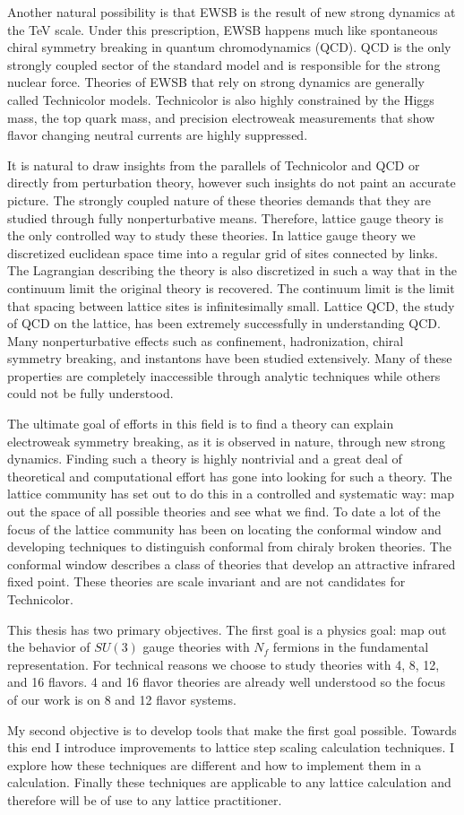 Another natural possibility is that EWSB is the result of new strong dynamics at the TeV scale.
Under this prescription, EWSB happens much like spontaneous chiral symmetry breaking in quantum chromodynamics (QCD).
QCD is the only strongly coupled sector of the standard model and is responsible for the strong nuclear force.
Theories of EWSB that rely on strong dynamics are generally called Technicolor models.
Technicolor is also highly constrained by the Higgs mass, the top quark mass, and precision electroweak measurements that show flavor changing neutral currents are highly suppressed.

It is natural to draw insights from the parallels of Technicolor and QCD or directly from perturbation theory, however such insights do not paint an accurate picture.
The strongly coupled nature of these theories demands that they are studied through fully nonperturbative means.
Therefore, lattice gauge theory is the only controlled way to study these theories.
In lattice gauge theory we discretized euclidean space time into a regular grid of sites connected by links.
The Lagrangian describing the theory is also discretized in such a way that in the continuum limit the original theory is recovered.
The continuum limit is the limit that spacing between lattice sites is infinitesimally small.
Lattice QCD, the study of QCD on the lattice, has been extremely successfully in understanding QCD.
Many nonperturbative effects such as confinement, hadronization, chiral symmetry breaking, and instantons have been studied extensively.
Many of these properties are completely inaccessible through analytic techniques while others could not be fully understood.

The ultimate goal of efforts in this field is to find a theory can explain electroweak symmetry breaking, as it is observed in nature, through new strong dynamics.
Finding such a theory is highly nontrivial and a great deal of theoretical and computational effort has gone into looking for such a theory.
The lattice community has set out to do this in a controlled and systematic way: map out the space of all possible theories and see what we find.
To date a lot of the focus of the lattice community has been on locating the conformal window and developing techniques to distinguish conformal from chiraly broken theories.
The conformal window describes a class of theories that develop an attractive infrared fixed point.
These theories are scale invariant and are not candidates for Technicolor.

This thesis has two primary objectives.
The first goal is a physics goal:  map out the behavior of $SU(3)$ gauge theories with $N_f$ fermions in the fundamental representation.
For technical reasons we choose to study theories with 4, 8, 12, and 16 flavors.
4 and 16 flavor theories are already well understood so the focus of our work is on 8 and 12 flavor systems.

My second objective is to develop tools that make the first goal possible.
Towards this end I introduce improvements to lattice step scaling calculation techniques.
I explore how these techniques are different and how to implement them in a calculation.
Finally these techniques are applicable to any lattice calculation and therefore will be of use to any lattice practitioner.
